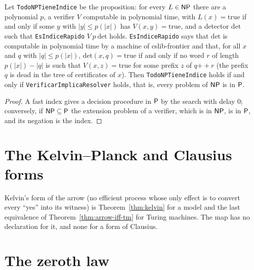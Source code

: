 \begin{theorem}
  \label{thm:arrow-fast-index}
  \leanok
  Let \texttt{TodoNPTieneIndice} be the proposition: for every $L \in \mathsf{NP}$ there are a polynomial
  $p$, a verifier $V$ computable in polynomial time, with $L(x) = \mathrm{true}$ if and only if some $y$
  with $|y| \le p(|x|)$ has $V(x, y) = \mathrm{true}$, and a detector $\mathrm{det}$ such that
  \texttt{EsIndiceRapido} $V\ p\ \mathrm{det}$ holds. \texttt{EsIndiceRapido} says that $\mathrm{det}$
  is computable in polynomial time by a machine of cslib-frontier and that, for all $x$ and $q$ with
  $|q| \le p(|x|)$, $\mathrm{det}(x, q) = \mathrm{true}$ if and only if no word $r$ of length
  $p(|x|) - |q|$ is such that $V(x, z) = \mathrm{true}$ for some prefix $z$ of $q \mathbin{+\!\!+} r$ (the prefix $q$ is dead in the tree of certificates of $x$). Then
  \texttt{TodoNPTieneIndice} holds if and only if \texttt{VerificarImplicaResolver} holds, that is,
  every problem of $\mathsf{NP}$ is in $\mathsf{P}$.
  \own{}
\end{theorem}

\begin{proof}
  \leanok
  A fast index gives a decision procedure in $\mathsf{P}$ by the search with delay $0$; conversely, if
  $\mathsf{NP} \subseteq \mathsf{P}$ the extension problem of a verifier, which is in $\mathsf{NP}$, is in $\mathsf{P}$, and its
  negation is the index.
\end{proof}

\section{The Kelvin--Planck and Clausius forms}
\label{sec:arrow-kelvin}

Kelvin's form of the arrow (no efficient process whose only effect is to convert every
``yes'' into its witness) is Theorem~\ref{thm:kelvin} for a model and the last equivalence of
Theorem~\ref{thm:arrow-iff-tm} for Turing machines. The map has no declaration for it, and none for a
form of Clausius.

\section{The zeroth law}
\label{sec:arrow-zero}

